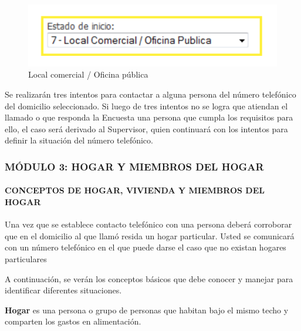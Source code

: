 \documentclass[
  openany]{book}
\begin{document}
\begin{figure}

{\centering \includegraphics[width=1\linewidth]{imagenes/figura6-45} 

}

\caption{Local comercial / Oficina pública}\label{fig:Localcomer5}
\end{figure}

Se realizarán tres intentos para contactar a alguna persona del número telefónico del domicilio seleccionado. Si luego de tres intentos no se logra que atiendan el llamado o que responda la Encuesta una persona que cumpla los requisitos para ello, el caso será derivado al Supervisor, quien continuará con los intentos para definir la situación del número telefónico.

\hypertarget{muxf3dulo-3-hogar-y-miembros-del-hogar}{%
\subsubsection{\texorpdfstring{\textbf{MÓDULO 3: HOGAR Y MIEMBROS DEL HOGAR}}{MÓDULO 3: HOGAR Y MIEMBROS DEL HOGAR}}\label{muxf3dulo-3-hogar-y-miembros-del-hogar}}

\hypertarget{conceptos-de-hogar-vivienda-y-miembros-del-hogar}{%
\paragraph{\texorpdfstring{\textbf{CONCEPTOS DE HOGAR, VIVIENDA Y MIEMBROS DEL HOGAR}}{CONCEPTOS DE HOGAR, VIVIENDA Y MIEMBROS DEL HOGAR}}\label{conceptos-de-hogar-vivienda-y-miembros-del-hogar}}

Una vez que se establece contacto telefónico con una persona deberá corroborar que en el domicilio al que llamó resida un hogar particular. Usted se comunicará con un número telefónico en el que puede darse el caso que no existan hogares particulares

A continuación, se verán los conceptos básicos que debe conocer y manejar para identificar diferentes situaciones.

\textbf{Hogar} es una persona o grupo de personas que habitan bajo el mismo techo y comparten los gastos en alimentación.
\end{document}
